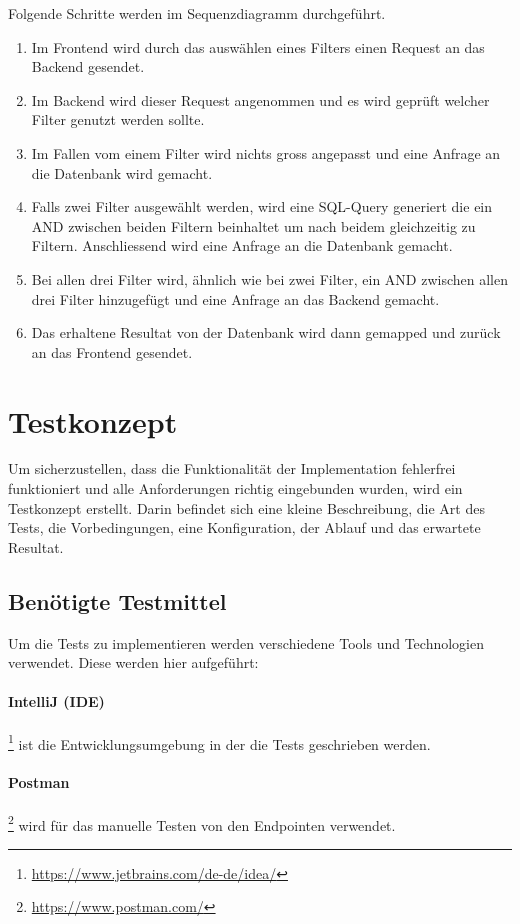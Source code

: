 Folgende Schritte werden im Sequenzdiagramm durchgeführt.
\begin{enumerate}
	\item Im Frontend wird durch das auswählen eines Filters einen Request an das Backend gesendet.
	\item Im Backend wird dieser Request angenommen und es wird geprüft welcher Filter genutzt werden sollte.
	\item Im Fallen vom einem Filter wird nichts gross angepasst und eine Anfrage an die Datenbank wird gemacht.
	\item Falls zwei Filter ausgewählt werden, wird eine SQL-Query generiert die ein AND zwischen beiden Filtern beinhaltet um nach beidem gleichzeitig zu Filtern. Anschliessend wird eine Anfrage an die Datenbank gemacht.
	\item Bei allen drei Filter wird, ähnlich wie bei zwei Filter, ein AND zwischen allen drei Filter hinzugefügt und eine Anfrage an das Backend gemacht.
	\item Das erhaltene Resultat von der Datenbank wird dann gemapped und zurück an das Frontend gesendet.
\end{enumerate}

\section{Testkonzept}
Um sicherzustellen, dass die Funktionalität der Implementation fehlerfrei funktioniert und alle Anforderungen richtig eingebunden wurden, wird ein Testkonzept erstellt. Darin befindet sich eine kleine Beschreibung, die Art des Tests, die Vorbedingungen, eine Konfiguration, der Ablauf und das erwartete Resultat.

\subsection{Benötigte Testmittel}
Um die Tests zu implementieren werden verschiedene Tools und Technologien verwendet. Diese werden hier aufgeführt:

\paragraph{IntelliJ (IDE)} \footnote{\url{https://www.jetbrains.com/de-de/idea/}} ist die Entwicklungsumgebung in der die Tests geschrieben werden.
\paragraph{Postman} \footnote{\url{https://www.postman.com/}} wird für das manuelle Testen von den Endpointen verwendet.
